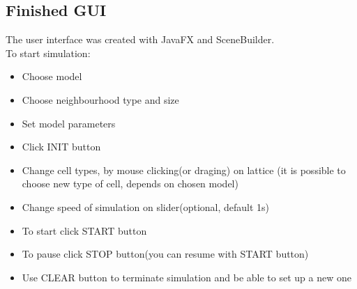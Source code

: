 \documentclass[a4paper, 11pt]{article}
\begin{document}
\subsection{Finished GUI}
The user interface was created with JavaFX and SceneBuilder.\\
To start simulation:
\begin{itemize}
\item Choose model
\item Choose neighbourhood type and size
\item Set model parameters
\item Click INIT button
\item Change cell types, by mouse clicking(or draging) on lattice (it is possible to choose new type of cell, depends on chosen model)
\item Change speed of simulation on slider(optional, default 1s)
\item To start click START button
\item To pause click STOP button(you can resume with START button)
\item Use CLEAR button to terminate simulation and be able to set up a new one

\end{itemize}
\end{document}
